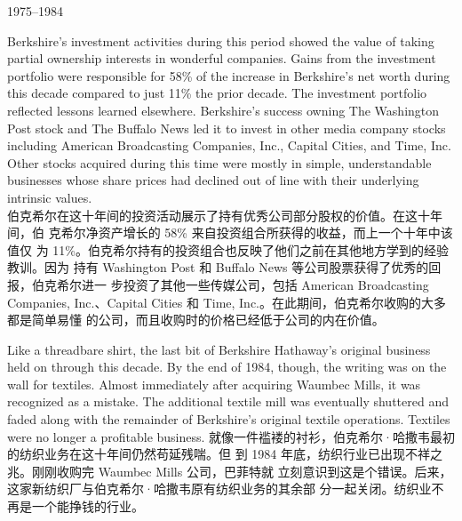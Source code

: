 \begin{section}{1975--1984}
\begin{verseparallel}
  {
    Berkshire's investment activities during this period showed the value of
    taking partial ownership interests in wonderful companies. Gains from the
    investment portfolio were responsible for 58\% of the increase in
    Berkshire's net worth during this decade compared to just 11\% the prior
    decade. The investment portfolio reflected lessons learned elsewhere.
    Berkshire's success owning The Washington Post stock and The Buffalo News
    led it to invest in other media company stocks including American
    Broadcasting Companies, Inc., Capital Cities, and Time, Inc. Other stocks
    acquired during this time were mostly in simple, understandable businesses
    whose share prices had declined out of line with their underlying intrinsic
    values. \\
  }
  {
    伯克希尔在这十年间的投资活动展示了持有优秀公司部分股权的价值。在这十年间，伯
    克希尔净资产增长的 58\% 来自投资组合所获得的收益，而上一个十年中该值仅
    为 11\%。伯克希尔持有的投资组合也反映了他们之前在其他地方学到的经验教训。因为
    持有 Washington Post 和 Buffalo News 等公司股票获得了优秀的回报，伯克希尔进一
    步投资了其他一些传媒公司，包括 American Broadcasting Companies,
    Inc.、Capital Cities 和 Time, Inc.。在此期间，伯克希尔收购的大多都是简单易懂
    的公司，而且收购时的价格已经低于公司的内在价值。
  }
\end{verseparallel}

\begin{verseparallel}
  {
    Like a threadbare shirt, the last bit of Berkshire Hathaway's original
    business held on through this decade. By the end of 1984, though, the
    writing was on the wall for textiles. Almost immediately after acquiring
    Waumbec Mills, it was recognized as a mistake. The additional textile mill
    was eventually shuttered and faded along with the remainder of Berkshire's
    original textile operations. Textiles were no longer a profitable business.
  }
  {
    就像一件褴褛的衬衫，伯克希尔·哈撒韦最初的纺织业务在这十年间仍然苟延残喘。但
    到 1984 年底，纺织行业已出现不祥之兆。刚刚收购完 Waumbec Mills 公司，巴菲特就
    立刻意识到这是个错误。后来，这家新纺织厂与伯克希尔·哈撒韦原有纺织业务的其余部
    分一起关闭。纺织业不再是一个能挣钱的行业。
  }
\end{verseparallel}
\end{section}

